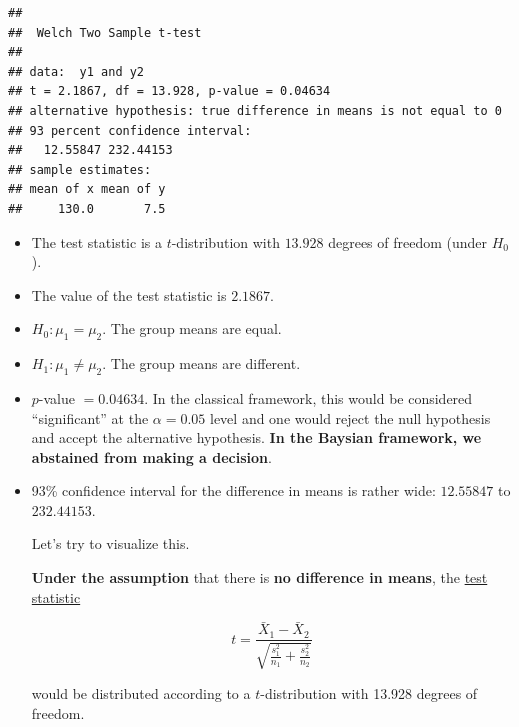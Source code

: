 \documentclass[
]{book}
\begin{document}
\begin{verbatim}
## 
##  Welch Two Sample t-test
## 
## data:  y1 and y2
## t = 2.1867, df = 13.928, p-value = 0.04634
## alternative hypothesis: true difference in means is not equal to 0
## 93 percent confidence interval:
##   12.55847 232.44153
## sample estimates:
## mean of x mean of y 
##     130.0       7.5
\end{verbatim}

\begin{itemize}
\item
  The test statistic is a \(t\)-distribution with \(13.928\) degrees of freedom (under \(H_0\)).
\item
  The value of the test statistic is \(2.1867\).
\item
  \(H_0: \mu_1 = \mu_2\). The group means are equal.
\item
  \(H_1: \mu_1 \ne \mu_2\). The group means are different.
\item
  \(p\)-value \(= 0.04634\). In the classical framework,
  this would be considered ``significant'' at the \(\alpha = 0.05\) level
  and one would reject the null hypothesis and accept the alternative hypothesis.
  \textbf{In the Baysian framework, we abstained from making a decision}.
\item
  93\% confidence interval for the difference in means is rather wide:
  \(12.55847\) to \(232.44153\).

  Let's try to visualize this.

  \textbf{Under the assumption} that there is \textbf{no difference in means},
  the \href{https://en.wikipedia.org/wiki/Student\%27s_t-test\#Equal_or_unequal_sample_sizes,_unequal_variances_(sX1_\%3E_2sX2_or_sX2_\%3E_2sX1)}{test statistic}

  \[ t = \frac{\bar{X}_1 - \bar{X}_2}{\sqrt{\frac{s_1^2}{n_1} + \frac{s_2^2}{n_2}}} \]

  would be distributed according to a \(t\)-distribution with 13.928 degrees of freedom.
\end{itemize}
\end{document}
